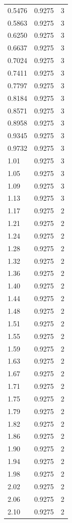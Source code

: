 \begin{longtable}{lrr}
  0.5476 & 0.9275 & 3 \\
  0.5863 & 0.9275 & 3 \\
  0.6250 & 0.9275 & 3 \\
  0.6637 & 0.9275 & 3 \\
  0.7024 & 0.9275 & 3 \\
  0.7411 & 0.9275 & 3 \\
  0.7797 & 0.9275 & 3 \\
  0.8184 & 0.9275 & 3 \\
  0.8571 & 0.9275 & 3 \\
  0.8958 & 0.9275 & 3 \\
  0.9345 & 0.9275 & 3 \\
  0.9732 & 0.9275 & 3 \\
  1.01 & 0.9275 & 3 \\
  1.05 & 0.9275 & 3 \\
  1.09 & 0.9275 & 3 \\
  1.13 & 0.9275 & 3 \\
  1.17 & 0.9275 & 2 \\
  1.21 & 0.9275 & 2 \\
  1.24 & 0.9275 & 2 \\
  1.28 & 0.9275 & 2 \\
  1.32 & 0.9275 & 2 \\
  1.36 & 0.9275 & 2 \\
  1.40 & 0.9275 & 2 \\
  1.44 & 0.9275 & 2 \\
  1.48 & 0.9275 & 2 \\
  1.51 & 0.9275 & 2 \\
  1.55 & 0.9275 & 2 \\
  1.59 & 0.9275 & 2 \\
  1.63 & 0.9275 & 2 \\
  1.67 & 0.9275 & 2 \\
  1.71 & 0.9275 & 2 \\
  1.75 & 0.9275 & 2 \\
  1.79 & 0.9275 & 2 \\
  1.82 & 0.9275 & 2 \\
  1.86 & 0.9275 & 2 \\
  1.90 & 0.9275 & 2 \\
  1.94 & 0.9275 & 2 \\
  1.98 & 0.9275 & 2 \\
  2.02 & 0.9275 & 2 \\
  2.06 & 0.9275 & 2 \\
  2.10 & 0.9275 & 2 \\

\end{longtable}
